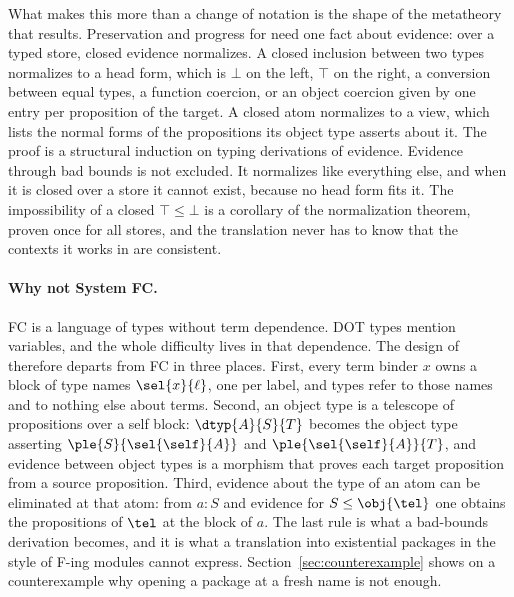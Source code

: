 What makes this more than a change of notation is the shape of the metatheory that results. Preservation and progress for \FCdot need one fact about evidence: over a typed store, closed evidence normalizes. A closed inclusion between two types normalizes to a head form, which is $\bot$ on the left, $\top$ on the right, a conversion between equal types, a function coercion, or an object coercion given by one entry per proposition of the target. A closed atom normalizes to a view, which lists the normal forms of the propositions its object type asserts about it. The proof is a structural induction on typing derivations of evidence. Evidence through bad bounds is not excluded. It normalizes like everything else, and when it is closed over a store it cannot exist, because no head form fits it. The impossibility of a closed $\top \le \bot$ is a corollary of the normalization theorem, proven once for all stores, and the translation never has to know that the contexts it works in are consistent.

\paragraph{Why not System FC.}
FC is a language of types without term dependence. DOT types mention variables, and the whole difficulty lives in that dependence. The design of \FCdot therefore departs from FC in three places. First, every term binder $x$ owns a block of type names $\sel{x}{\ell}$, one per label, and types refer to those names and to nothing else about terms. Second, an object type is a telescope of propositions over a self block: $\dtyp{A}{S}{T}$ becomes the object type asserting $\ple{S}{\sel{\self}{A}}$ and $\ple{\sel{\self}{A}}{T}$, and evidence between object types is a morphism that proves each target proposition from a source proposition. Third, evidence about the type of an atom can be eliminated at that atom: from $a : S$ and evidence for $S \le \obj{\tel}$ one obtains the propositions of $\tel$ at the block of $a$. The last rule is what a bad-bounds derivation becomes, and it is what a translation into existential packages in the style of F-ing modules \cite{rossberg2014fing} cannot express. Section~\ref{sec:counterexample} shows on a counterexample why opening a package at a fresh name is not enough.

